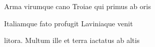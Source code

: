 Arma virumque cano Troiae qui primus ab oris

Italiamque fato profugit Laviniaque venit

litora. Multum ille et terra iactatus ab altis

